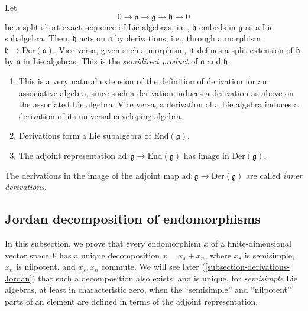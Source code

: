 Let 
$$0 \to  \mathfrak a \to \mathfrak g \to \mathfrak h \to 0$$ be a split short exact sequence of Lie algebras, i.e., $\mathfrak h$ embeds in $\mathfrak g$ as a Lie subalgebra. Then, $\mathfrak h$ acts on $\mathfrak a$ by derivations, i.e., through a morphism $\mathfrak h\to \text{Der}(\mathfrak a)$. Vice versa, given such a morphism, it defines a split extension of $\mathfrak h$ by $\mathfrak a$ in Lie algebras. This is the {\it semidirect product} of $\mathfrak a$ and $\mathfrak h$.



\begin{remarks}
\label{remarks-derivations}
 \begin{enumerate}
  \item This is a very natural extension of the definition of derivation for an associative algebra, since such a derivation induces a derivation as above on the associated Lie algebra. Vice versa, a derivation of a Lie algebra induces a derivation of its universal enveloping algebra.
  \item Derivations form a Lie subalgebra of $\text{End}(\mathfrak g)$.
  \item The adjoint representation $\text{ad}:\mathfrak g\to \text{End}(\mathfrak g)$ has image in $\text{Der}(\mathfrak g)$. 
 \end{enumerate}
\end{remarks}

\begin{definition}
 \label{definition-inner-derivation}
 The derivations in the image of the adjoint map $\text{ad}: \mathfrak g\to \text{Der}(\mathfrak g)$ are called {\it inner derivations}.
\end{definition}



\subsection{Jordan decomposition of endomorphisms}
\label{subsection-Jordan-endomorphisms}

In this subsection, we prove that every endomorphism $x$ of a finite-dimensional vector space $V$ has a unique decomposition $x=x_s+x_n$, where $x_s$ is semisimple, $x_n$ is nilpotent, and $x_s, x_n$ commute. We will see later (\ref{subsection-derivations-Jordan}) that such a decomposition also exists, and is unique, for \emph{semisimple} Lie algebras, at least in characteristic zero, when the ``semisimple'' and ``nilpotent'' parts of an element are defined in terms of the adjoint representation.


